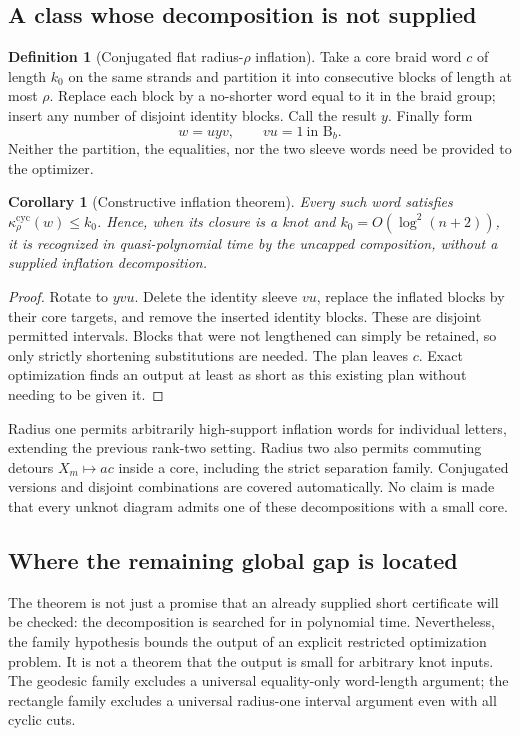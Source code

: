\documentclass[11pt,a4paper]{article}
\newtheorem{corollary}[theorem]{Corollary}
\theoremstyle{definition}\newtheorem{definition}[theorem]{Definition}
\theoremstyle{remark}\newtheorem{remark}[theorem]{Remark}
\newcommand{\B}{\mathrm B}
\newcommand{\kc}[1]{\kappa^{\mathrm{cyc}}_{#1}}
\begin{document}
\subsection{A class whose decomposition is not supplied}
\begin{definition}[Conjugated flat radius-$\rho$ inflation]
Take a core braid word $c$ of length $k_0$ on the same strands and partition
it into consecutive blocks of length at most $\rho$. Replace each block
by a no-shorter word equal to it in the braid group; insert any number of
disjoint identity blocks. Call the result $y$. Finally form
\[
 w=u y v,\qquad vu=1\ \text{in }\B_b.
\]
Neither the partition, the equalities, nor the two sleeve words need be
provided to the optimizer.
\end{definition}

\begin{corollary}[Constructive inflation theorem]\label{cor:inflation}
Every such word satisfies $\kc{\rho}(w)\le k_0$. Hence, when its closure
is a knot and $k_0=O(\log^2(n+2))$, it is recognized in quasi-polynomial
time by the uncapped composition, without a supplied inflation decomposition.
\end{corollary}
\begin{proof}
Rotate to $yvu$. Delete the identity sleeve $vu$, replace the inflated
blocks by their core targets, and remove the inserted identity blocks.
These are disjoint permitted intervals. Blocks that were not lengthened
can simply be retained, so only strictly shortening substitutions are
needed. The plan leaves $c$. Exact optimization finds an output at least
as short as this existing plan without needing to be given it.
\end{proof}

Radius one permits arbitrarily high-support inflation words for individual
letters, extending the previous rank-two setting. Radius two also permits
commuting detours $X_m\mapsto ac$ inside a core, including the strict
separation family. Conjugated versions and disjoint combinations are
covered automatically. No claim is made that every unknot diagram admits
one of these decompositions with a small core.

\subsection{Where the remaining global gap is located}
The theorem is not just a promise that an already supplied short certificate
will be checked: the decomposition is searched for in polynomial time.
Nevertheless, the family hypothesis bounds the output of an explicit
restricted optimization problem. It is not a theorem that the output is
small for arbitrary knot inputs. The geodesic family excludes a universal
equality-only word-length argument; the rectangle family excludes a
universal radius-one interval argument even with all cyclic cuts.
\end{document}
